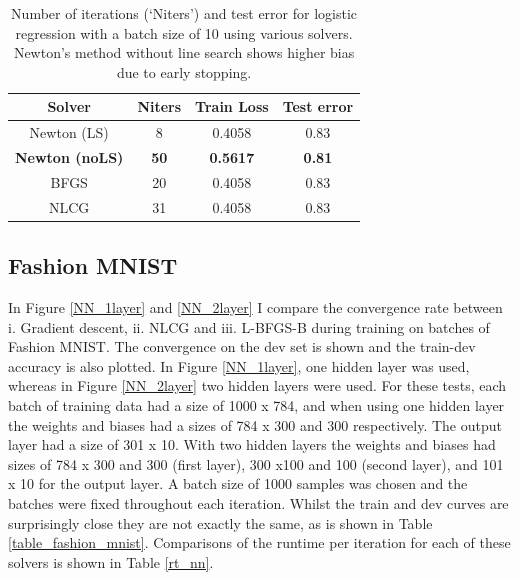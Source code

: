 \documentclass[nohyperref]{article}
\theoremstyle{plain}
\theoremstyle{definition}
\theoremstyle{remark}
\begin{document}
\begin{table}[h!]
\begin{center}
\begin{tabular}{ cccc} %
\hline
Solver & Niters & Train Loss & Test error  \\ 
\hline 
\hline
Newton (LS) & 8 & 0.4058 & 0.83\\ 
\textbf{Newton (noLS)} & \textbf{50} & \textbf{0.5617} & \textbf{0.81}\\ 
BFGS & 20 & 0.4058 & 0.83\\ 
NLCG & 31 & 0.4058 & 0.83\\ 
\end{tabular}
\end{center}
\caption{Number of iterations (`Niters')  and test error for logistic regression with a batch size of 10 using various solvers. Newton's method without line search shows higher bias due to early stopping.}\label{table_sfixlogreg_testerror}
\end{table}

\subsection{Fashion MNIST} \label{results_NN}
In Figure \ref{NN_1layer} and \ref{NN_2layer} I compare the convergence rate between i. Gradient descent,  ii. NLCG and  iii. L-BFGS-B during training on batches of Fashion MNIST. The convergence on the dev set is shown and the train-dev accuracy is also plotted. In Figure \ref{NN_1layer}, one hidden layer was used, whereas in Figure \ref{NN_2layer} two hidden layers were used. For these tests, each batch of training data had a size of 1000 x 784, and when using one hidden layer the weights and biases had a sizes of 784 x 300 and 300 respectively. The output layer had a size of 301 x 10. With two hidden layers the weights and biases had sizes of 784 x 300 and 300 (first layer), 300 x100 and 100 (second layer), and 101 x 10 for the output layer. A batch size of 1000 samples was chosen and the batches were fixed throughout each iteration. Whilst the train and dev curves are surprisingly close they are not exactly the same, as is shown in Table \ref{table_fashion_mnist}. Comparisons of the runtime per iteration for each of these solvers is shown in Table \ref{rt_nn}.
\end{document}
